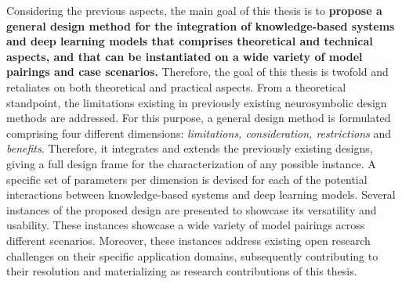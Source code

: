 Considering the previous aspects, the main goal of this thesis is to \textbf{propose a general design method for the integration of knowledge-based systems and deep learning models that comprises theoretical and technical aspects, and that can be instantiated on a wide variety of model pairings and case scenarios.} Therefore, the goal of this thesis is twofold and retaliates on both theoretical and practical aspects. From a theoretical standpoint, the limitations existing in previously existing neurosymbolic design methods are addressed. For this purpose, a general design method is formulated comprising four different dimensions: \textit{limitations, consideration, restrictions} and \textit{benefits}. Therefore, it integrates and extends the previously existing designs, giving a full design frame for the characterization of any possible instance. A specific set of parameters per dimension is devised for each of the potential interactions between knowledge-based systems and deep learning models. Several instances of the proposed design are presented to showcase its versatility and usability. These instances showcase a wide variety of model pairings across different scenarios. Moreover, these instances address existing open research challenges on their specific application domains, subsequently contributing to their resolution and materializing as research contributions of this thesis.

